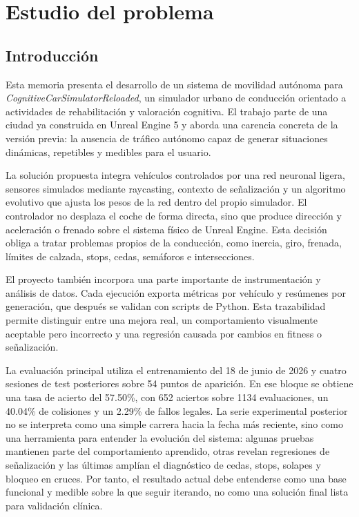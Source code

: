 \chapter{Estudio del problema}

\section{Introducción}

Esta memoria presenta el desarrollo de un sistema de movilidad autónoma para \textit{CognitiveCarSimulatorReloaded}, un simulador urbano de conducción orientado a actividades de rehabilitación y valoración cognitiva. El trabajo parte de una ciudad ya construida en Unreal Engine 5 y aborda una carencia concreta de la versión previa: la ausencia de tráfico autónomo capaz de generar situaciones dinámicas, repetibles y medibles para el usuario.

La solución propuesta integra vehículos controlados por una red neuronal ligera, sensores simulados mediante raycasting, contexto de señalización y un algoritmo evolutivo que ajusta los pesos de la red dentro del propio simulador. El controlador no desplaza el coche de forma directa, sino que produce dirección y aceleración o frenado sobre el sistema físico de Unreal Engine. Esta decisión obliga a tratar problemas propios de la conducción, como inercia, giro, frenada, límites de calzada, stops, cedas, semáforos e intersecciones.

El proyecto también incorpora una parte importante de instrumentación y análisis de datos. Cada ejecución exporta métricas por vehículo y resúmenes por generación, que después se validan con scripts de Python. Esta trazabilidad permite distinguir entre una mejora real, un comportamiento visualmente aceptable pero incorrecto y una regresión causada por cambios en fitness o señalización.

La evaluación principal utiliza el entrenamiento del 18 de junio de 2026 y cuatro sesiones de test posteriores sobre 54 puntos de aparición. En ese bloque se obtiene una tasa de acierto del 57.50\%, con 652 aciertos sobre 1134 evaluaciones, un 40.04\% de colisiones y un 2.29\% de fallos legales. La serie experimental posterior no se interpreta como una simple carrera hacia la fecha más reciente, sino como una herramienta para entender la evolución del sistema: algunas pruebas mantienen parte del comportamiento aprendido, otras revelan regresiones de señalización y las últimas amplían el diagnóstico de cedas, stops, solapes y bloqueo en cruces. Por tanto, el resultado actual debe entenderse como una base funcional y medible sobre la que seguir iterando, no como una solución final lista para validación clínica.

